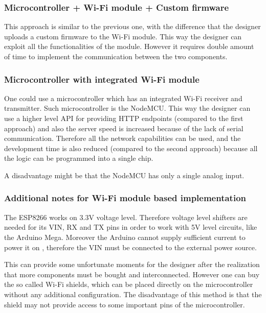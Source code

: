 \subsubsection{Microcontroller + Wi-Fi module + Custom firmware}

This approach is similar to the previous one, with the difference that the designer uploads a custom firmware to the Wi-Fi module. This way the designer can exploit all the functionalities of the module. However it requires double amount of time to implement the communication between the two components.


\subsubsection{Microcontroller with integrated Wi-Fi module}

One could use a microcontroller which has an integrated Wi-Fi receiver and transmitter. Such microcontroller is the NodeMCU. This way the designer can use a higher level API for providing HTTP endpoints (compared to the first approach) and also the server speed is increased because of the lack of serial communication. Therefore all the network capabilities can be used, and the development time is also reduced (compared to the second approach) because all the logic can be programmed into a single chip.

A disadvantage might be that the NodeMCU has only a single analog input.

\subsubsection{Additional notes for Wi-Fi module based implementation}

The ESP8266 works on 3.3V voltage level. Therefore voltage level shifters are needed for its VIN, RX and TX pins in order to work with 5V level circuits, like the Arduino Mega. Moreover the Arduino cannot supply sufficient current to power it on , therefore the VIN must be connected to the external power source.

This can provide some unfortunate moments for the designer after the realization that more components must be bought and interconnected. However one can buy the so called Wi-Fi shields, which can be placed directly on the microcontroller without any additional configuration. The disadvantage of this method is that the shield may not provide access to some important pins of the microcontroller.




